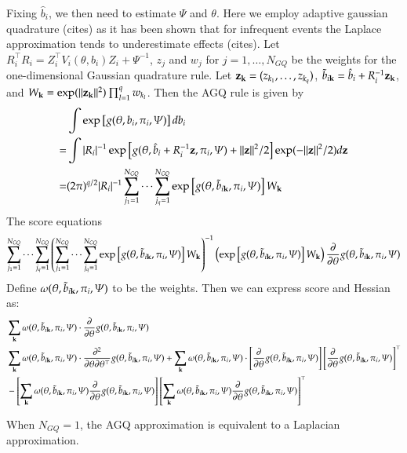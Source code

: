 \documentclass[11pt]{amsart}
\def\k{{\bf k}}
\def\z{{\bf z}}
\begin{document}
Fixing $\hat b_i$, we then need to estimate $\Psi$ and $\theta$. Here we employ adaptive gaussian quadrature (cites) as it has been shown that for infrequent events the Laplace approximation tends to underestimate effects (cites).  Let $R_i^\top R_i = Z_i^\top V_i (\theta, b_i) Z_i + \Psi^{-1}$, $z_j$ and $w_j$ for $j=1,\ldots, N_{GQ}$ be the weights for the one-dimensional Gaussian quadrature rule.  Let $\z_\k = (z_{k_1},\ldots, z_{k_q})$, $\tilde b_{i \k} = \hat b_i + R_i^{-1} \z_\k$, and $W_{\k} = \exp ( \| \z_\k \|^2 ) \prod_{l=1}^{q} w_{k_l}$.  Then the AGQ rule is given by
$$
\begin{aligned}
&\int \exp \left[ g(\theta, b_i, \pi_{i}, \Psi) \right] db_i \\
=& \int | R_i |^{-1} \exp \left[ g(\theta, \hat b_i + R_i^{-1} \z, \pi_{i}, \Psi) + \| \z \|^2 / 2 \right] \exp ( - \| \z \|^2 / 2 ) d\z \\
=& (2 \pi)^{q/2} | R_i |^{-1} \sum_{j_1 =1}^{N_{GQ}} \cdots \sum_{j_q =1}^{N_{GQ}} \exp \left[ g(\theta, \tilde b_{i \k}, \pi_{i}, \Psi) \right] W_{\k}
\end{aligned}
$$
The score equations
$$
\sum_{j_1 =1}^{N_{GQ}} \cdots \sum_{j_q =1}^{N_{GQ}}
\left( \sum_{j_1 =1}^{N_{GQ}} \cdots \sum_{j_q =1}^{N_{GQ}} \exp \left[ g(\theta, \tilde b_{i \k}, \pi_{i}, \Psi) \right] W_{\k} \right)^{-1}
\left( \exp \left[ g(\theta, \tilde b_{i \k}, \pi_{i}, \Psi) \right] W_{\k} \right) \frac{\partial}{\partial \theta} g(\theta, \tilde b_{i \k}, \pi_i, \Psi)
$$
Define $\omega(\theta, \tilde b_{i \k}, \pi_i, \Psi)$ to be the weights.  Then we can express score and Hessian as:
$$
\begin{aligned}
&\sum_{\k} \omega(\theta, \tilde b_{i \k}, \pi_i, \Psi) \cdot \frac{\partial}{\partial \theta} g(\theta, \tilde b_{i \k}, \pi_i, \Psi) \\
&\sum_{\k}
\omega(\theta, \tilde b_{i \k}, \pi_i, \Psi) \cdot \frac{\partial^2}{\partial \theta \partial \theta^\top} g(\theta, \tilde b_{i \k}, \pi_i, \Psi) +
\sum_{\k} \omega(\theta, \tilde b_{i \k}, \pi_i, \Psi) \cdot \left [\frac{\partial}{\partial \theta} g(\theta, \tilde b_{i \k}, \pi_i, \Psi) \right] \left [\frac{\partial}{\partial \theta} g(\theta, \tilde b_{i \k}, \pi_i, \Psi) \right]^\top \\
&- \left[ \sum_{\k} \omega(\theta, \tilde b_{i \k}, \pi_i, \Psi) \frac{\partial}{\partial \theta} g(\theta, \tilde b_{i \k}, \pi_i, \Psi) \right] \left[ \sum_{\k} \omega(\theta, \tilde b_{i \k}, \pi_i, \Psi) \frac{\partial}{\partial \theta} g(\theta, \tilde b_{i \k}, \pi_i, \Psi) \right]^\top
\end{aligned}
$$



When $N_{GQ} = 1$, the AGQ approximation is equivalent to a Laplacian approximation.
\end{document}
